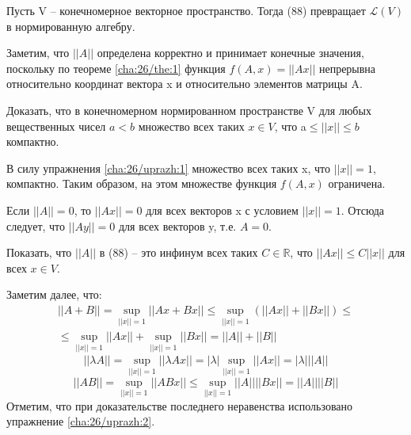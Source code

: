 \begin{theorem}[]\label{cha:26/the:3}
	Пусть V – конечномерное векторное пространство. Тогда (88) превращает $\mathcal{L}(V)$ в нормированную алгебру.
\end{theorem}
\begin{Proof}
	Заметим, что $||A||$ определена корректно и принимает конечные значения, поскольку по теореме \ref{cha:26/the:1} функция $f(A,x) = ||Ax||$ непрерывна относительно координат вектора x и относительно элементов матрицы A. 

	\begin{uprazh}[]\label{cha:26/uprazh:1}
		Доказать, что в конечномерном нормированном пространстве V для любых вещественных чисел $a < b$ множество всех таких $x \in V$, что a$ \le ||x|| \le b$ компактно.
	\end{uprazh}

	В силу упражнения \ref{cha:26/uprazh:1} множество всех таких x, что $||x|| = 1$, компактно. Таким образом, на этом множестве функция $f(A,x)$ ограничена.

	Если $||A|| = 0$, то $||Ax|| = 0$ для всех векторов x с условием $||x|| = 1$. Отсюда следует, что $||Ay|| = 0$ для всех векторов y, т.е. $A = 0$.

	\begin{uprazh}[]\label{cha:26/uprazh:2}
		Показать, что $||A||$ в (88) – это инфинум всех таких $C \in \mathbb{R}$, что $||Ax|| \le C||x||$ для всех $x \in V$.
	\end{uprazh}
	
	Заметим далее, что:
	$$\begin{gathered}
		||A+B|| = \underset{||x||=1}{\sup}||Ax+Bx|| \le \underset{||x||=1}{\sup}\left( ||Ax||+||Bx|| \right) \le \\
		\le \underset{||x||=1}{\sup}||Ax|| + \underset{||x||=1}{\sup}||Bx|| = ||A|| + ||B||
	\end{gathered}$$
	$$||\lambda A|| = \underset{||x||=1}{\sup}||\lambda A x|| = |\lambda| \underset{||x||=1}{\sup}||A x|| = |\lambda| ||A||$$
	$$||AB|| = \underset{||x||=1}{\sup}||ABx|| \le \underset{||x||=1}{\sup}||A||||Bx|| = ||A||||B||$$
	Отметим, что при доказательстве последнего неравенства использовано упражнение \ref{cha:26/uprazh:2}.
\end{Proof}


























